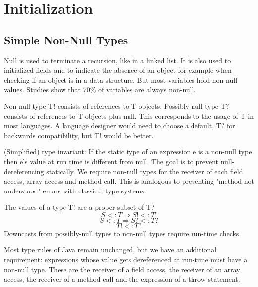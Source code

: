 \section{Initialization}
\subsection{Simple Non-Null Types}
\begin{mytitle} Null is used to terminate a recursion, like in a linked list. It is also used to initialized fields and to indicate the absence of an object for example when checking if an object is in a data structure. But most variables hold non-null values. Studies show that 70\% of variables are always non-null.
\end{mytitle}
\begin{mytitle} Non-null type T! consists of references to T-objects. Possibly-null type T? consists of references to T-objects plus null. This corresponds to the usage of T in most languages. A language designer would need to choose a default, T? for backwards compatibility, but T! would be better.
\end{mytitle}
\begin{mytitle} (Simplified) type invariant: If the static type of an expression e is a non-null type then e's value at run time is different from null. The goal is to prevent null-dereferencing statically. We require non-null types for the receiver of each field access, array access and method call. This is analogous to preventing "method not understood" errors with classical type systems.
\end{mytitle}
\begin{mytitle} The values of a type T! are a proper subset of T?
    $$ S <: T \Rightarrow S! <: T!$$
    $$ S <: T \Rightarrow S? <: T?$$
    $$T! <: T?$$
Downcasts from possibly-null types to non-null types require run-time checks.
\end{mytitle}
\begin{mytitle} Most type rules of Java remain unchanged, but we have an additional requirement: expressions whose value gets dereferenced at run-time must have a non-null type. These are the receiver of a field access, the receiver of an array access, the receiver of a method call and the expression of a throw statement.
\end{mytitle}
